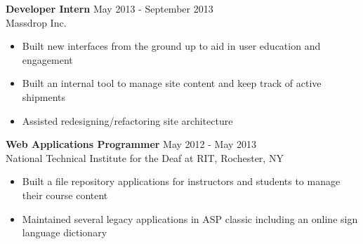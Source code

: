 \documentclass[line,margin]{res}
\begin{document}
\begin{resume}
{\bf Developer Intern} \hfill May 2013 - September 2013\\
    Massdrop Inc.
    \begin{itemize}
    \item Built new interfaces from the ground up to aid in user education and engagement
    \item Built an internal tool to manage site content and keep track of active shipments
    \item Assisted redesigning/refactoring site architecture
    \end{itemize}

{\bf Web Applications Programmer} \hfill May 2012 - May 2013\\
    National Technical Institute for the Deaf at RIT,
  Rochester, NY

  \begin{itemize} %
  \item Built a file repository applications for instructors and students to manage their course content
  \item Maintained several legacy applications in ASP classic including an online sign language dictionary
  \end{itemize}

\end{resume}
\end{document}
